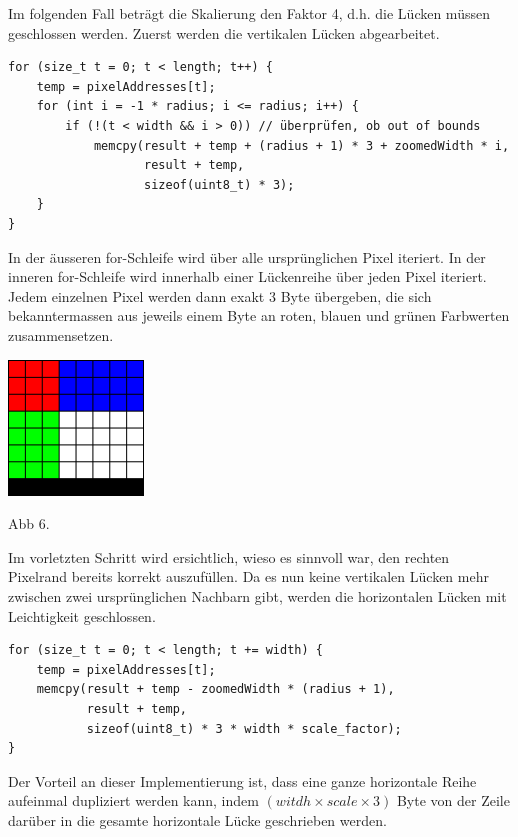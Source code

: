\documentclass[course=erap]{aspdoc}
\begin{document}
Im folgenden Fall beträgt die Skalierung den Faktor 4, d.h. die Lücken müssen geschlossen werden. Zuerst werden die vertikalen Lücken abgearbeitet. \\

\begin{lstlisting}
for (size_t t = 0; t < length; t++) {
    temp = pixelAddresses[t];
    for (int i = -1 * radius; i <= radius; i++) {
        if (!(t < width && i > 0)) // überprüfen, ob out of bounds
            memcpy(result + temp + (radius + 1) * 3 + zoomedWidth * i,
                   result + temp,
                   sizeof(uint8_t) * 3);
    }
}
\end{lstlisting}
\vspace{1em} 
In der äusseren for-Schleife wird über alle ursprünglichen Pixel iteriert. In der inneren for-Schleife wird innerhalb einer Lückenreihe über jeden Pixel iteriert. Jedem einzelnen Pixel werden dann exakt 3 Byte übergeben, die sich bekanntermassen aus jeweils einem Byte an roten, blauen und grünen Farbwerten zusammensetzen. \\

\pagebreak

\centering
\includegraphics[width=0.27\textwidth]{"2x2_5"}
\begin{center}
\vspace{-0.5em}
  Abb 6.
\vspace{-0.5em}  
\end{center}
\justify

Im vorletzten Schritt wird ersichtlich, wieso es sinnvoll war, den rechten Pixelrand bereits korrekt auszufüllen. Da es nun keine vertikalen Lücken mehr zwischen zwei ursprünglichen Nachbarn gibt, werden die horizontalen Lücken mit Leichtigkeit geschlossen.
\begin{lstlisting}
for (size_t t = 0; t < length; t += width) {
    temp = pixelAddresses[t];
    memcpy(result + temp - zoomedWidth * (radius + 1),
           result + temp,
           sizeof(uint8_t) * 3 * width * scale_factor);
}
\end{lstlisting}
Der Vorteil an dieser Implementierung ist, dass eine ganze horizontale Reihe aufeinmal dupliziert werden kann, indem $(witdh \times scale \times 3)$ Byte von der Zeile darüber in die gesamte horizontale Lücke geschrieben werden.\\
\end{document}
